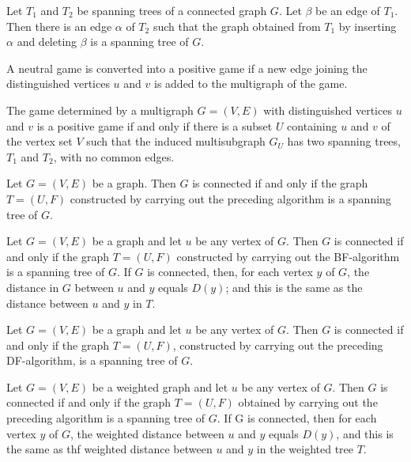 \begin{theorem}
  \label{thm:11.5.9}
  Let $T_1$ and $T_2$ be spanning trees of a connected graph $G$. Let $\beta$ be an edge of $T_1$. Then there is an edge $\alpha$ of $T_2$ such that the graph obtained from $T_1$ by inserting $\alpha$ and deleting $\beta$ is a spanning tree of $G$.
\end{theorem}

\begin{theorem}
  \label{thm:11.6.1}
  A neutral game is converted into a positive game if a new edge joining the distinguished vertices 
  $u$ and $v$ is added to the multigraph of the game.
\end{theorem}

\begin{theorem}
  \label{thm:11.6.2}
  The game determined by a multigraph $G = (V, E)$ with distinguished vertices $u$ and $v$ is a 
  positive game if and only if there is a subset $U$ containing $u$ and $v$ of the vertex set $V$ 
  such that the induced multisubgraph $G_U$ has two spanning trees, $T_1$ and $T_2$, with no common 
  edges.
\end{theorem}

\begin{theorem}
  \label{thm:11.7.1}
  Let $G = (V, E)$ be a graph. Then $G$ is connected if and only if the graph $T = (U, F)$ 
  constructed by carrying out the preceding algorithm is a spanning tree of $G$.
\end{theorem}

\begin{theorem}
  \label{thm:11.7.2}
  Let $G = (V, E)$ be a graph and let $u$ be any vertex of $G$. Then $G$ is connected if and only if
  the graph $T = (U, F)$ constructed by carrying out the BF-algorithm is a spanning tree of $G$. If 
  $G$ is connected, then, for each vertex $y$ of $G$, the distance in $G$ between $u$ and $y$ equals
  $D(y)$; and this is the same as the distance between $u$ and $y$ in $T$.
\end{theorem}

\begin{theorem}
  \label{thm:11.7.3}
  Let $G = (V, E)$ be a graph and let $u$ be any vertex of $G$. Then $G$ is connected if and only if
  the graph $T = (U, F)$, constructed by carrying out the preceding DF-algorithm, is a spanning tree
  of $G$.
\end{theorem}

\begin{theorem}
  \label{thm:11.7.4}
  Let $G = (V, E)$ be a weighted graph and let $u$ be any vertex of $G$. Then $G$ is connected if 
  and only if the graph $T = (U, F)$ obtained by carrying out the preceding algorithm is a spanning
  tree of $G$. If G is connected, then for each vertex $y$ of $G$, the weighted distance between $u$
  and $y$ equals $D(y)$, and this is the same as thf weighted distance between $u$ and $y$ in the 
  weighted tree $T$.
\end{theorem}

